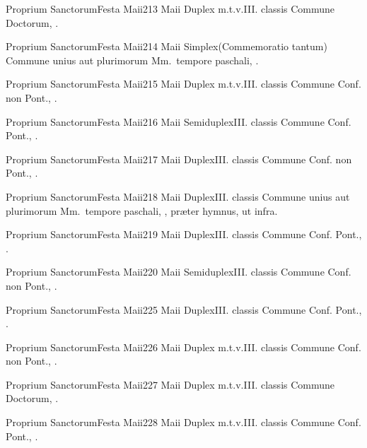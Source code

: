 \documentclass[nocturnale-romanum.tex]{subfiles}
\begin{document}
	{Proprium Sanctorum}{Festa Maii}{2}{13 Maii}
	{Duplex m.t.v.}{III. classis}
	{Commune Doctorum, \pageref{M-CODO}.}
	{}

	{Proprium Sanctorum}{Festa Maii}{2}{14 Maii}
	{Simplex}{(Commemoratio tantum)}
	{Commune unius aut plurimorum Mm.\ tempore paschali, \pageref{M-MRTP}.}
	{}

	{Proprium Sanctorum}{Festa Maii}{2}{15 Maii}
	{Duplex m.t.v.}{III. classis}
	{Commune Conf. non Pont., \pageref{M-CONP}.}
	{}

	{Proprium Sanctorum}{Festa Maii}{2}{16 Maii}
	{Semiduplex}{III. classis}
	{Commune Conf. Pont., \pageref{M-COPO}.}
	{}

	{Proprium Sanctorum}{Festa Maii}{2}{17 Maii}
	{Duplex}{III. classis}
	{Commune Conf. non Pont., \pageref{M-CONP}.}
	{}

	{Proprium Sanctorum}{Festa Maii}{2}{18 Maii}
	{Duplex}{III. classis}
	{Commune unius aut plurimorum Mm.\ tempore paschali, \pageref{M-MRTP}, præter hymnus, ut infra.}
	{}

	{Proprium Sanctorum}{Festa Maii}{2}{19 Maii}
	{Duplex}{III. classis}
	{Commune Conf. Pont., \pageref{M-COPO}.}
	{}

	{Proprium Sanctorum}{Festa Maii}{2}{20 Maii}
	{Semiduplex}{III. classis}
	{Commune Conf. non Pont., \pageref{M-CONP}.}
	{}

	{Proprium Sanctorum}{Festa Maii}{2}{25 Maii}
	{Duplex}{III. classis}
	{Commune Conf. Pont., \pageref{M-COPO}.}
	{}

	{Proprium Sanctorum}{Festa Maii}{2}{26 Maii}
	{Duplex m.t.v.}{III. classis}
	{Commune Conf. non Pont., \pageref{M-CONP}.}
	{}

	{Proprium Sanctorum}{Festa Maii}{2}{27 Maii}
	{Duplex m.t.v.}{III. classis}
	{Commune Doctorum, \pageref{M-CODO}.}
	{}

	{Proprium Sanctorum}{Festa Maii}{2}{28 Maii}
	{Duplex m.t.v.}{III. classis}
	{Commune Conf. Pont., \pageref{M-COPO}.}
	{}
\end{document}
